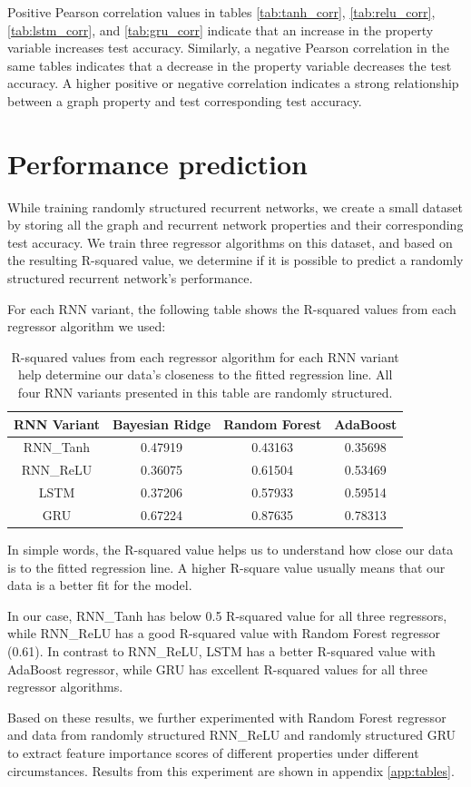 Positive Pearson correlation values in tables \ref{tab:tanh_corr}, \ref{tab:relu_corr}, \ref{tab:lstm_corr}, and \ref{tab:gru_corr} indicate that an increase in the property variable increases test accuracy. Similarly, a negative Pearson correlation in the same tables indicates that a decrease in the property variable decreases the test accuracy. A higher positive or negative correlation indicates a strong relationship between a graph property and test corresponding test accuracy.

\section{Performance prediction}

While training randomly structured recurrent networks, we create a small dataset by storing all the graph and recurrent network properties and their corresponding test accuracy. We train three regressor algorithms on this dataset, and based on the resulting R-squared value, we determine if it is possible to predict a randomly structured recurrent network's performance.

For each RNN variant, the following table shows the R-squared values from each regressor algorithm we used:

\begin{table}[h]
	\centering
	\begin{tabular}{|c||c|c|c|}
	    \hline
		\textbf{RNN Variant} & \textbf{Bayesian Ridge} & \textbf{Random Forest} & \textbf{AdaBoost}\\
		\hline
		RNN\_Tanh & 0.47919 & 0.43163 & 0.35698\\
		RNN\_ReLU & 0.36075 & 0.61504 & 0.53469\\
		LSTM & 0.37206 & 0.57933 & 0.59514\\
		GRU & 0.67224 & 0.87635 & 0.78313\\
		\hline
	\end{tabular}
	\caption[R-squared values from each regressor algorithm, for each RNN variant]{R-squared values from each regressor algorithm for each RNN variant help determine our data's closeness to the fitted regression line. All four RNN variants presented in this table are randomly structured.}
	\label{tab:r-squared}
\end{table}

In simple words, the R-squared value helps us to understand how close our data is to the fitted regression line. A higher R-square value usually means that our data is a better fit for the model.

In our case, RNN\_Tanh has below 0.5 R-squared value for all three regressors, while RNN\_ReLU has a good R-squared value with Random Forest regressor (0.61). In contrast to RNN\_ReLU, LSTM has a better R-squared value with AdaBoost regressor, while GRU has excellent R-squared values for all three regressor algorithms.

Based on these results, we further experimented with Random Forest regressor and data from randomly structured RNN\_ReLU and randomly structured GRU to extract feature importance scores of different properties under different circumstances. Results from this experiment are shown in appendix \ref{app:tables}.